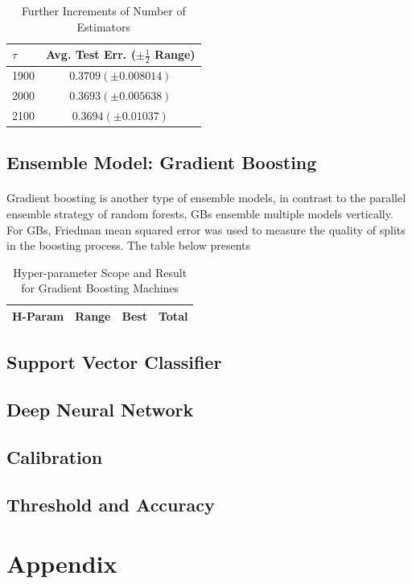 \documentclass[11pt]{article}
\begin{document}
 	\begin{table}[H]
	 	\centering
		\begin{tabular}{l|c}
			$\tau$ & Avg. Test Err. ($\pm \frac{1}{2}$ Range) \\
			\hline
			1900 & $0.3709(\pm 0.008014)$ \\
			2000 & $0.3693(\pm 0.005638)$ \\
			2100 & $0.3694(\pm 0.01037)$ 
		\end{tabular}
		\caption{Further Increments of Number of Estimators}
	\end{table}
 
 	\subsection{Ensemble Model: Gradient Boosting}
 	\paragraph{} Gradient boosting is another type of ensemble models, in contrast to the parallel ensemble strategy of random forests, GBs ensemble multiple models vertically. For GBs, Friedman mean squared error was used to measure the quality of splits in the boosting process. The table below presents 
 	\begin{table}
 		\centering
 		\begin{tabular}{l|c|c|c}
 		H-Param & Range & Best & Total \\
 		\hline
 			
 		\end{tabular}
 		\caption{Hyper-parameter Scope and Result for Gradient Boosting Machines}
 	\end{table}
 	
 	\subsection{Support Vector Classifier}
 	
 	\subsection{Deep Neural Network}
 	
 	\subsection{Calibration}
 	
 	\subsection{Threshold and Accuracy}
 	
	\section{Appendix}
\end{document}
